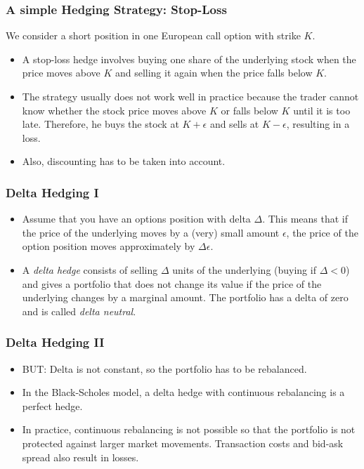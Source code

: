 \begin{frame}[fragile]
\frametitle{A simple Hedging Strategy: Stop-Loss}
We consider a short position in one European call option with strike $K$.
\begin{itemize}
  \item A stop-loss hedge involves buying one share of the underlying stock when
  the price moves above $K$ and selling it again when the price falls below $K$.
  \item The strategy usually does not work well in practice because the trader
  cannot know whether the stock price moves above $K$ or falls below $K$ until
  it is too late. Therefore, he buys the stock at $K+\epsilon$ and sells at
  $K-\epsilon$, resulting in a loss.
  \item Also, discounting has to be taken into account.
\end{itemize}
\end{frame}


\begin{frame}[fragile]
\frametitle{Delta Hedging I}
\begin{itemize}
  \item Assume that you have an options position with delta $\Delta$. This means
  that if the price of the underlying moves by a (very) small amount $\epsilon$, the
  price of the option position moves approximately by $\Delta \epsilon$.
  \item A \emph{delta hedge} consists of selling $\Delta$ units of the
  underlying (buying if $\Delta <0$) and gives a portfolio that does not
  change its value if the price of the underlying changes by a marginal amount.
  The portfolio has a delta of zero and is called \emph{delta neutral}.
\end{itemize}
\end{frame}

\begin{frame}[fragile]
\frametitle{Delta Hedging II}
\begin{itemize}
  \item BUT: Delta is not constant, so the portfolio has to be rebalanced.
  \item In the Black-Scholes model, a delta hedge with continuous rebalancing is
  a perfect hedge.
  \item In practice, continuous rebalancing is not possible so that the
  portfolio is not protected against larger market movements. Transaction
  costs and bid-ask spread also result in losses.
\end{itemize}
\end{frame}



